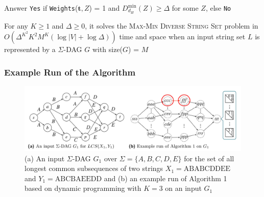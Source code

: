 \documentclass{beamer}
\begin{document}
\begin{frame}
\begin{algorithm}[H]
{\begin{algorithmic}[1]
                        \EndFor
                    \EndFor
                \EndFor
            \EndFor
            \State Answer \texttt{Yes} if \texttt{Weights}($\mathbf{t}, Z$) = 1 and $D_{d_H}^{\text{min}}(Z) \geq \Delta$ for some $Z$, else \texttt{No}
        \end{algorithmic}}
    \end{algorithm}
    \small{For any $K \geq 1$ and $\Delta \geq 0$, it solves the \textsc{Max-Min Diverse String Set} problem in $O(\Delta^{K^2} K^2 M^K (\log |V| + \log \Delta))$ time and space when an input string set $L$ is represented by a $\Sigma$-DAG $G$ with size($G$) = $M$}
\end{frame}

\begin{frame}
    \frametitle{Example Run of the Algorithm}
        \begin{figure}[h]
            \centering
            \includegraphics[width=1\textwidth]{6Kc2XEQ.png}
            \caption{(a) An input $\Sigma$-DAG $G_1$ over $\Sigma = \{A, B, C, D, E\}$ for the set of all longest common subsequences of two strings $X_1 = \text{ABABCDDEE}$ and $Y_1 = \text{ABCBAEEDD}$ and (b) an example run of Algorithm 1 based on dynamic programming with $K = 3$ on an input $G_1$}
            \label{fig:example}
        \end{figure}




\end{frame}
\end{document}
